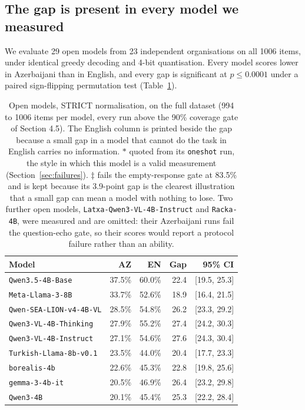 \documentclass[final]{clv2025}
\begin{document}
\subsection{The gap is present in every model we measured}

We evaluate 29 open models from 23 independent organisations on all 1006 items,
under identical greedy decoding and 4-bit quantisation. Every model scores
lower in Azerbaijani than in English, and every gap is significant at
$p \le 0.0001$ under a paired sign-flipping permutation test
(Table~\ref{tab:open-models}).

\begin{table}[h!]
\caption{Open models, STRICT normalisation, on the full dataset (994 to 1006
items per model, every run above the 90\% coverage gate of Section 4.5). The
English column is printed beside the gap because a small gap in a model that
cannot do the task in English carries no information.
$*$ quoted from its \texttt{oneshot} run, the style in which this model is a
valid measurement (Section~\ref{sec:failures}).
$\ddagger$ fails the empty-response gate at 83.5\% and is kept because its
3.9-point gap is the clearest illustration that a small gap can mean a model
with nothing to lose. Two further open models,
\texttt{Latxa-Qwen3-VL-4B-Instruct} and \texttt{Racka-4B}, were measured and
are omitted: their Azerbaijani runs fail the question-echo gate, so their
scores would report a protocol failure rather than an ability.}
\label{tab:open-models}
\centering
\begin{tabular}{lrrrr}
\toprule
Model & AZ & EN & Gap & 95\% CI \\
\midrule
\texttt{Qwen3.5-4B-Base} & 37.5\% & 60.0\% & 22.4 & [19.5, 25.3] \\
\texttt{Meta-Llama-3-8B} & 33.7\% & 52.6\% & 18.9 & [16.4, 21.5] \\
\texttt{Qwen-SEA-LION-v4-4B-VL} & 28.5\% & 54.8\% & 26.2 & [23.3, 29.2] \\
\texttt{Qwen3-VL-4B-Thinking} & 27.9\% & 55.2\% & 27.4 & [24.2, 30.3] \\
\texttt{Qwen3-VL-4B-Instruct} & 27.1\% & 54.6\% & 27.6 & [24.3, 30.4] \\
\texttt{Turkish-Llama-8b-v0.1} & 23.5\% & 44.0\% & 20.4 & [17.7, 23.3] \\
\texttt{borealis-4b} & 22.6\% & 45.3\% & 22.8 & [19.8, 25.6] \\
\texttt{gemma-3-4b-it} & 20.5\% & 46.9\% & 26.4 & [23.2, 29.8] \\
\texttt{Qwen3-4B} & 20.1\% & 45.4\% & 25.3 & [22.2, 28.4] \\

\end{tabular}
\end{table}
\end{document}
